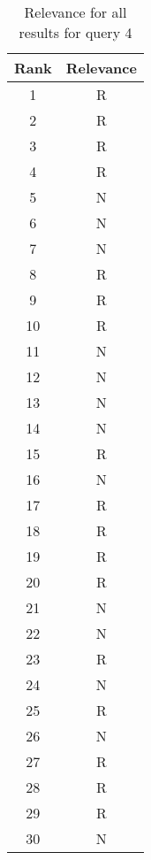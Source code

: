 \begin{table}[H]
    \centering
    \begin{tabular}{|c|c|}
    \hline
    \rowcolor[gray]{0.9} Rank & Relevance \\ \hline
    1 & R \\ \hline
2 & R \\ \hline
3 & R \\ \hline
4 & R \\ \hline
5 & N \\ \hline
6 & N \\ \hline
7 & N \\ \hline
8 & R \\ \hline
9 & R \\ \hline
10 & R \\ \hline
11 & N \\ \hline
12 & N \\ \hline
13 & N \\ \hline
14 & N \\ \hline
15 & R \\ \hline
16 & N \\ \hline
17 & R \\ \hline
18 & R \\ \hline
19 & R \\ \hline
20 & R \\ \hline
21 & N \\ \hline
22 & N \\ \hline
23 & R \\ \hline
24 & N \\ \hline
25 & R \\ \hline
26 & N \\ \hline
27 & R \\ \hline
28 & R \\ \hline
29 & R \\ \hline
30 & N \\ \hline

    \end{tabular}
    \caption{Relevance for all results for query 4}
    \label{tab:query4_results}
\end{table}
    

